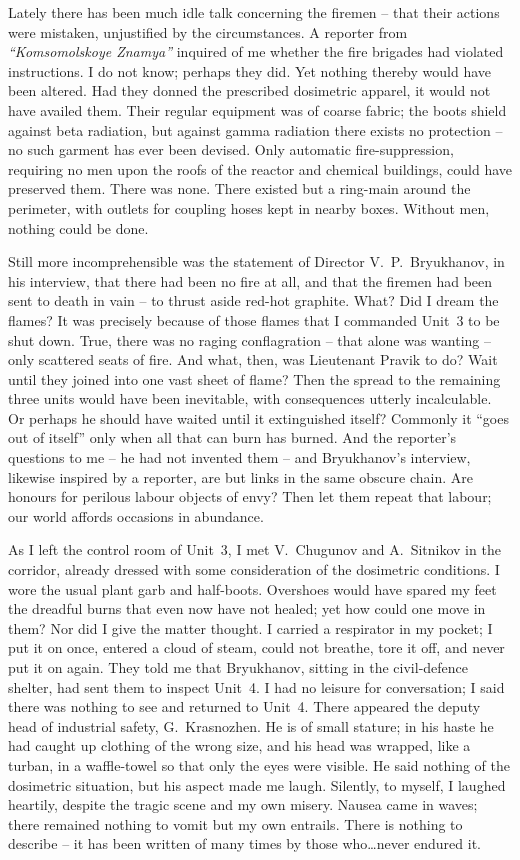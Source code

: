\documentclass[openright]{bookest}
\begin{document}
Lately there has been much idle talk concerning the firemen -- that their actions were mistaken, unjustified by the circumstances. A reporter from \textit{``Komsomolskoye Znamya''} inquired of me whether the fire brigades had violated instructions. I do not know; perhaps they did. Yet nothing thereby would have been altered. Had they donned the prescribed dosimetric apparel, it would not have availed them. Their regular equipment was of coarse fabric; the boots shield against beta radiation, but against gamma radiation there exists no protection -- no such garment has ever been devised. Only automatic fire-suppression, requiring no men upon the roofs of the reactor and chemical buildings, could have preserved them. There was none. There existed but a ring-main around the perimeter, with outlets for coupling hoses kept in nearby boxes. Without men, nothing could be done.

Still more incomprehensible was the statement of Director V.~P.~Bryukhanov, in his interview, that there had been no fire at all, and that the firemen had been sent to death in vain -- to thrust aside red-hot graphite. What? Did I dream the flames? It was precisely because of those flames that I commanded Unit~3 to be shut down. True, there was no raging conflagration -- that alone was wanting -- only scattered seats of fire. And what, then, was Lieutenant Pravik to do? Wait until they joined into one vast sheet of flame? Then the spread to the remaining three units would have been inevitable, with consequences utterly incalculable. Or perhaps he should have waited until it extinguished itself? Commonly it ``goes out of itself'' only when all that can burn has burned. And the reporter's questions to me -- he had not invented them -- and Bryukhanov's interview, likewise inspired by a reporter, are but links in the same obscure chain. Are honours for perilous labour objects of envy? Then let them repeat that labour; our world affords occasions in abundance.

As I left the control room of Unit~3, I met V.~Chugunov and A.~Sitnikov in the corridor, already dressed with some consideration of the dosimetric conditions. I wore the usual plant garb and half-boots. Overshoes would have spared my feet the dreadful burns that even now have not healed; yet how could one move in them? Nor did I give the matter thought. I carried a respirator in my pocket; I put it on once, entered a cloud of steam, could not breathe, tore it off, and never put it on again. They told me that Bryukhanov, sitting in the civil-defence shelter, had sent them to inspect Unit~4. I had no leisure for conversation; I said there was nothing to see and returned to Unit~4. There appeared the deputy head of industrial safety, G.~Krasnozhen. He is of small stature; in his haste he had caught up clothing of the wrong size, and his head was wrapped, like a turban, in a waffle-towel so that only the eyes were visible. He said nothing of the dosimetric situation, but his aspect made me laugh. Silently, to myself, I laughed heartily, despite the tragic scene and my own misery. Nausea came in waves; there remained nothing to vomit but my own entrails. There is nothing to describe -- it has been written of many times by those who\ldots never endured it.
\end{document}
